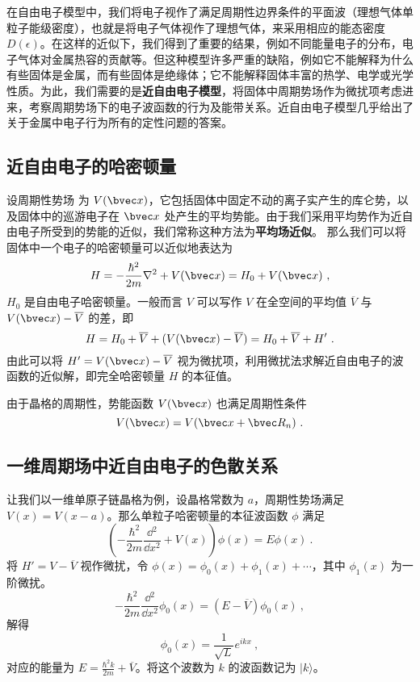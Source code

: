 

在自由电子模型中，我们将电子视作了满足周期性边界条件的平面波（理想气体单粒子能级密度），也就是将电子气体视作了理想气体，来采用相应的能态密度 $D(\epsilon)$。在这样的近似下，我们得到了重要的结果，例如不同能量电子的分布，电子气体对金属热容的贡献等。但这种模型许多严重的缺陷，例如它不能解释为什么有些固体是金属，而有些固体是绝缘体；它不能解释固体丰富的热学、电学或光学性质。为此，我们需要的是\textbf{近自由电子模型}，将固体中周期势场作为微扰项考虑进来，考察周期势场下的电子波函数的行为及能带关系。近自由电子模型几乎给出了关于金属中电子行为所有的定性问题的答案。

\subsection{近自由电子的哈密顿量}
设周期性势场 为 $V(\bvec x)$，它包括固体中固定不动的离子实产生的库仑势，以及固体中的巡游电子在 $\bvec x$ 处产生的平均势能。由于我们采用平均势作为近自由电子所受到的势能的近似，我们常称这种方法为\textbf{平均场近似}。
那么我们可以将固体中一个电子的哈密顿量可以近似地表达为
\begin{equation}
H=-\frac{\hbar^2}{2m}\nabla^2+V(\bvec x)=H_0+V(\bvec x)~,
\end{equation}
$H_0$ 是自由电子哈密顿量。一般而言 $V$ 可以写作 $V$ 在全空间的平均值 $\overline V$ 与 $V(\bvec x)-\overline V$ 的差，即
\begin{equation}
H=H_0+\overline V+(V(\bvec x)-\overline V)=H_0+\overline V+H'~.
\end{equation}
由此可以将 $H'=V(\bvec x)-\overline V$ 视为微扰项，利用微扰法求解近自由电子的波函数的近似解，即完全哈密顿量 $H$ 的本征值。

由于晶格的周期性，势能函数 $V(\bvec x)$ 也满足周期性条件
\begin{equation}
V(\bvec x)=V(\bvec x+\bvec R_n)~.
\end{equation}
\subsection{一维周期场中近自由电子的色散关系}
让我们以一维单原子链晶格为例，设晶格常数为 $a$，周期性势场满足 $V(x)=V(x-a)$。那么单粒子哈密顿量的本征波函数 $\phi$ 满足
\begin{equation}\label{eq_egasmd_1}
\left(-\frac{\hbar^2}{2m}\frac{\dd{}^2}{\dd x^2}+V(x)\right)\phi(x)=E\phi(x)~.
\end{equation}
将 $H'=V-\overline V$ 视作微扰，令 $\phi(x)=\phi_0(x)+\phi_1(x)+\cdots$，其中 $\phi_1(x)$ 为一阶微扰。
\begin{equation}
-\frac{\hbar^2}{2m}\frac{\dd{}^2}{\dd x^2} \phi_0(x)=(E-\overline V)\phi_0(x)~,
\end{equation}
解得
\begin{equation}
\phi_0(x)=\frac{1}{\sqrt{L}}e^{ikx}~,
\end{equation}
对应的能量为 $E=\frac{\hbar^2 k}{2m}+\overline V$。将这个波数为 $k$ 的波函数记为 $|k\rangle$。

